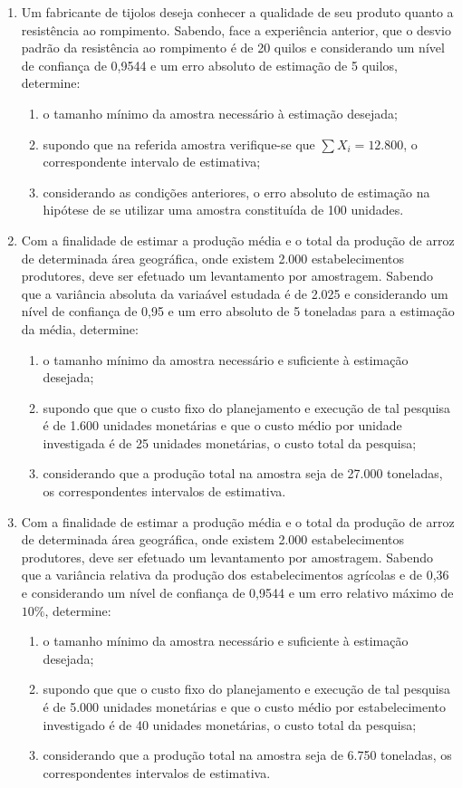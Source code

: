 \begin{enumerate}[resume]
\item Um fabricante de tijolos deseja conhecer a qualidade de seu produto quanto a resistência ao rompimento. Sabendo, face a experiência anterior, que o desvio padrão da resistência ao rompimento é de 20 quilos e considerando um nível de confiança de 0,9544 e um erro absoluto de estimação de 5 quilos, determine:
	\begin{enumerate}
	\item o tamanho mínimo da amostra necessário à estimação desejada;
	\item supondo que na referida amostra verifique-se que $\sum X_{i} = 12.800$, o correspondente intervalo de estimativa;
	\item considerando as condições anteriores, o erro absoluto de estimação na hipótese de se utilizar uma amostra constituída de 100 unidades.
	\end{enumerate}

\item Com a finalidade de estimar a produção média e o total da produção de arroz de determinada área geográfica, onde existem 2.000 estabelecimentos produtores, deve ser efetuado um levantamento por amostragem. Sabendo que a variância absoluta da variaável estudada é de 2.025 e considerando um nível de confiança de 0,95 e um erro absoluto de 5 toneladas para a estimação da média, determine:
	\begin{enumerate}
	\item o tamanho mínimo da amostra necessário e suficiente à estimação desejada;
	\item supondo que que o custo fixo do planejamento e execução de tal pesquisa é de 1.600 unidades monetárias e que o custo médio por unidade investigada é de 25 unidades monetárias, o custo total da pesquisa;
	\item considerando que a produção total na amostra seja de 27.000 toneladas, os correspondentes intervalos de estimativa.
	\end{enumerate}

\item Com a finalidade de estimar a produção média e o total da produção de arroz de determinada área geográfica, onde existem 2.000 estabelecimentos produtores, deve ser efetuado um levantamento por amostragem. Sabendo que a variância relativa da produção dos estabelecimentos agrícolas e de 0,36 e considerando um nível de confiança de 0,9544 e um erro relativo máximo de $10\%$, determine:
	\begin{enumerate}
	\item o tamanho mínimo da amostra necessário e suficiente à estimação desejada;
	\item supondo que que o custo fixo do planejamento e execução de tal pesquisa é de 5.000 unidades monetárias e que o custo médio por estabelecimento investigado é de 40 unidades monetárias, o custo total da pesquisa;
	\item considerando que a produção total na amostra seja de 6.750 toneladas, os correspondentes intervalos de estimativa.
	\end{enumerate}


\end{enumerate}
